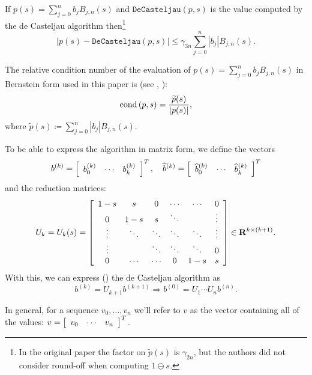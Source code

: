 \begin{theorem}
If \(p(s) = \sum_{j = 0}^n b_j B_{j, n}(s)\) and \(\mathtt{DeCasteljau}(p, s)\)
is the value computed by the de Casteljau algorithm then\footnote{In the
original paper the factor on \(\widetilde{p}(s)\) is \(\gamma_{2n}\),
but the authors did not consider round-off when computing
\(1 \ominus s\).}
\begin{equation}
\left|p(s) - \mathtt{DeCasteljau}(p, s)\right| \leq \gamma_{3n}
\sum_{j = 0}^n \left|b_j\right| B_{j, n}(s).
\end{equation}
\end{theorem}

The relative condition number of the evaluation of \(p(s) = \sum_{j = 0}^n
b_j B_{j, n}(s)\) in Bernstein form used in this paper is (see
\cite{Mainar1999}, \cite{Farouki1987}):
\begin{equation}
\operatorname{cond}\left(p, s\right) = \frac{\widetilde{p}(s)}{\left|p(s)\right|},
\end{equation}
where
\(\widetilde{p}(s) \coloneqq \sum_{j = 0}^n \left|b_j\right| B_{j, n}(s)\).

To be able to express the algorithm in matrix form, we define
the vectors
\begin{equation}
b^{(k)} = \left[\begin{array}{c c c} b_0^{(k)} & \cdots &
b_k^{(k)}\end{array}\right]^T, \quad
\widehat{b}^{(k)} = \left[\begin{array}{c c c} \widehat{b}_0^{(k)} & \cdots &
    \widehat{b}_k^{(k)}\end{array}\right]^T
\end{equation}
and the reduction matrices:
\begin{equation}
U_k = U_k(s) = \left[\begin{array}{c c c c c c}
    1 - s  & s      & 0      & \cdots & \cdots & 0      \\
    0      & 1 - s  & s      & \ddots &        & \vdots \\
    \vdots & \ddots & \ddots & \ddots & \ddots & \vdots \\
    \vdots &        & \ddots & \ddots & \ddots & 0 \\
    0      & \cdots & \cdots & 0      & 1 - s  & s
\end{array}\right] \in \mathbf{R}^{k \times (k + 1)}.
\end{equation}
With this, we can express (\cite{Mainar1999}) the de Casteljau algorithm as
\begin{equation}\label{matrix-de-casteljau}
b^{(k)} = U_{k + 1} b^{(k + 1)}
\Longrightarrow b^{(0)} = U_1 \cdots U_n b^{(n)}.
\end{equation}

In general, for a sequence \(v_0, \ldots, v_n\) we'll refer to \(v\)
as the vector containing all of the values:
\(v = \left[\begin{array}{c c c} v_0 & \cdots &
    v_n\end{array}\right]^T.\)
